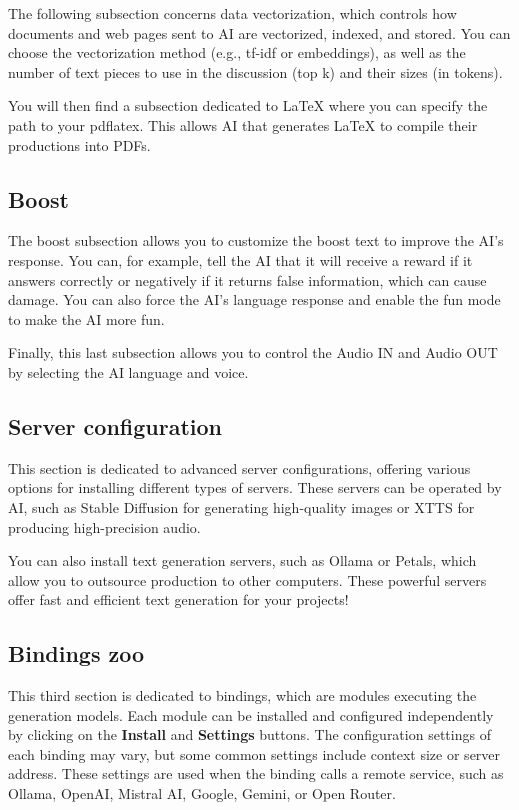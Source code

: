 \documentclass{article}
\begin{document}
The following subsection concerns data vectorization, which controls how documents and web pages sent to AI are vectorized, indexed, and stored. You can choose the vectorization method (e.g., tf-idf or embeddings), as well as the number of text pieces to use in the discussion (top k) and their sizes (in tokens).

You will then find a subsection dedicated to LaTeX where you can specify the path to your pdflatex. This allows AI that generates LaTeX to compile their productions into PDFs.

\subsection{Boost}

The boost subsection allows you to customize the boost text to improve the AI's response. You can, for example, tell the AI that it will receive a reward if it answers correctly or negatively if it returns false information, which can cause damage. You can also force the AI's language response and enable the fun mode to make the AI more fun.

Finally, this last subsection allows you to control the Audio IN and Audio OUT by selecting the AI language and voice.

\subsection{Server configuration}

This section is dedicated to advanced server configurations, offering various options for installing different types of servers. These servers can be operated by AI, such as Stable Diffusion for generating high-quality images or XTTS for producing high-precision audio.

You can also install text generation servers, such as Ollama or Petals, which allow you to outsource production to other computers. These powerful servers offer fast and efficient text generation for your projects!

\subsection{Bindings zoo}

This third section is dedicated to bindings, which are modules executing the generation models. Each module can be installed and configured independently by clicking on the \textbf{Install} and \textbf{Settings} buttons. The configuration settings of each binding may vary, but some common settings include context size or server address. These settings are used when the binding calls a remote service, such as Ollama, OpenAI, Mistral AI, Google, Gemini, or Open Router.
\end{document}
